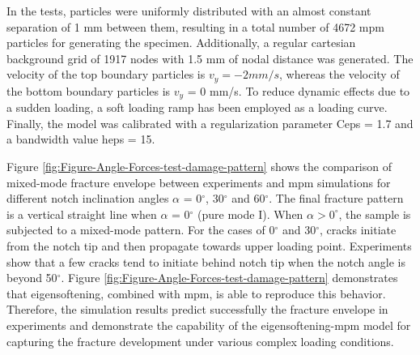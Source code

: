 \documentclass[preprint,12pt,a4paper]{elsarticle}
\begin{document}
In the tests, particles were uniformly distributed with an almost
constant separation of 1 mm between them, resulting in a total number of 4672
\acrshort{mpm} particles for generating the specimen. Additionally, a
regular cartesian background grid of 1917 nodes with 1.5 mm of nodal distance
was generated. The velocity of the top boundary particles is $v_y = − 2 mm/s$, 
whereas the velocity of the bottom boundary particles is $v_y$ = 0 mm/s.
To reduce dynamic effects due to a sudden loading, a soft loading ramp has been employed as a loading curve. 
Finally, the model was calibrated with a regularization parameter \gls{Ceps} = 1.7 and a
bandwidth value \gls{heps} = 15.

Figure \ref{fig:Figure-Angle-Forces-test-damage-pattern} shows the
comparison of mixed-mode fracture envelope between experiments and
\acrshort{mpm} simulations for different notch inclination angles
$\alpha$ = 0$^{\circ}$, 30$^{\circ}$ and 60$^{\circ}$. The final
fracture pattern is a vertical straight line when $\alpha$ = 0$^{\circ}$  (pure mode I). 
When $\alpha > 0^{\circ}$, the sample is
subjected to a mixed-mode pattern. For the cases of 0$^{\circ}$ and 30$^{\circ}$, cracks
initiate from the notch tip and then propagate towards upper loading
point. Experiments show that a few cracks tend to initiate behind
notch tip when the notch angle is beyond 50$^{\circ}$. Figure
\ref{fig:Figure-Angle-Forces-test-damage-pattern} demonstrates that
eigensoftening, combined with \acrshort{mpm}, is able to reproduce this
behavior. Therefore, the simulation results predict successfully the
fracture envelope in experiments and demonstrate the capability of
the eigensoftening-\acrshort{mpm} model for capturing the fracture
development under various complex loading conditions. 
\end{document}
